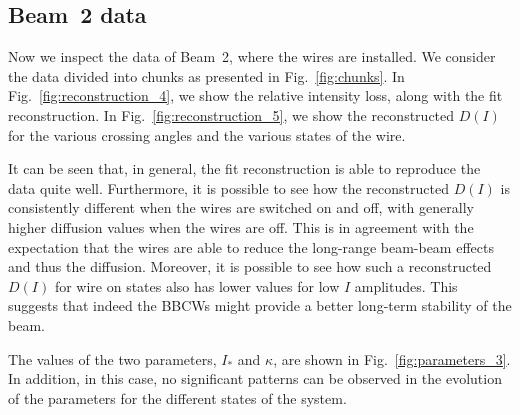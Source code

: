 \subsection*{Beam~2 data}

Now we inspect the data of Beam~2, where the wires are installed. We consider the data divided into chunks as presented in Fig.~\ref{fig:chunks}. In Fig.~\ref{fig:reconstruction_4}, we show the relative intensity loss, along with the fit reconstruction. In Fig.~\ref{fig:reconstruction_5}, we show the reconstructed $D(I)$ for the various crossing angles and the various states of the wire.

It can be seen that, in general, the fit reconstruction is able to reproduce the data quite well. Furthermore, it is possible to see how the reconstructed $D(I)$ is consistently different when the wires are switched on and off, with generally higher diffusion values when the wires are off. This is in agreement with the expectation that the wires are able to reduce the long-range beam-beam effects and thus the diffusion. Moreover, it is possible to see how such a reconstructed $D(I)$ for wire on states also has lower values for low $I$ amplitudes. This suggests that indeed the BBCWs might provide a better long-term stability of the beam.

The values of the two parameters, $I_\ast$ and $\kappa$, are shown in Fig.~\ref{fig:parameters_3}. In addition, in this case, no significant patterns can be observed in the evolution of the parameters for the different states of the system.


